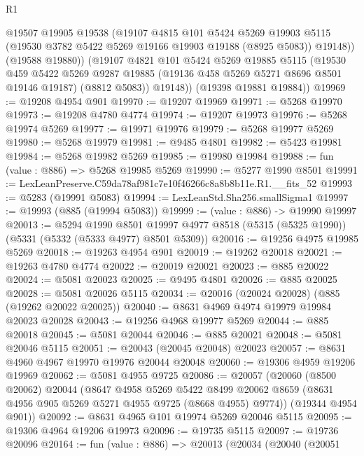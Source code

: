\begin{lexlean}{R1}
\begin{coremodule}
            @19507
            @19905
            @19538
            (@19107
              @4815
              @101
              @5424
              @5269
              @19903
              @5115
              (@19530 @3782 @5422 @5269 @19166 @19903 @19188 (@8925 @5083))
              @19148))
          (@19588 @19880))
        (@19107
          @4821
          @101
          @5424
          @5269
          @19885
          @5115
          (@19530
            @459
            @5422
            @5269
            @9287
            @19885
            (@19136 @458 @5269 @5271 @8696 @8501 @19146 @19187)
            (@8812 @5083))
          @19148))
      (@19398 @19881 @19884))
@19969 := @19208 @4954 @901
@19970 := @19207 @19969
@19971 := @5268 @19970
@19973 := @19208 @4780 @4774
@19974 := @19207 @19973
@19976 := @5268 @19974 @5269
@19977 := @19971 @19976
@19979 := @5268 @19977 @5269
@19980 := @5268 @19979
@19981 := @9485 @4801
@19982 := @5423 @19981
@19984 := @5268 @19982 @5269
@19985 := @19980 @19984
@19988 := fun (value : @886) => @5268 @19985 @5269
@19990 := @5277 @1990 @8501
@19991 := LexLeanPreserve.C59da78af981c7e10f46266c8a8b8b11e.R1.__fits_52
@19993 := @5283 (@19991 @5083)
@19994 := LexLeanStd.Sha256.smallSigma1
@19997 := @19993 (@885 (@19994 @5083))
@19999 := (value : @886) -> @19990 @19997
@20013 := @5294
    @1990
    @8501
    @19997
    @4977
    @8518
    (@5315 (@5325 @1990))
    (@5331 (@5332 (@5333 @4977) @8501 @5309))
@20016 := @19256 @4975 @19985 @5269
@20018 := @19263 @4954 @901
@20019 := @19262 @20018
@20021 := @19263 @4780 @4774
@20022 := @20019 @20021
@20023 := @885 @20022
@20024 := @5081 @20023
@20025 := @9495 @4801
@20026 := @885 @20025
@20028 := @5081 @20026 @5115
@20034 := @20016 (@20024 @20028) (@885 (@19262 @20022 @20025))
@20040 := @8631 @4969 @4974 @19979 @19984 @20023 @20028
@20043 := @19256 @4968 @19977 @5269
@20044 := @885 @20018
@20045 := @5081 @20044
@20046 := @885 @20021
@20048 := @5081 @20046 @5115
@20051 := @20043 (@20045 @20048) @20023
@20057 := @8631 @4960 @4967 @19970 @19976 @20044 @20048
@20060 := @19306 @4959 @19206 @19969
@20062 := @5081 @4955 @9725
@20086 := @20057
    (@20060
      (@8500 @20062)
      @20044
      (@8647
        @4958
        @5269
        @5422
        @8499
        @20062
        @8659
        (@8631 @4956 @905 @5269 @5271 @4955 @9725 (@8668 @4955) @9774))
      (@19344 @4954 @901))
@20092 := @8631 @4965 @101 @19974 @5269 @20046 @5115
@20095 := @19306 @4964 @19206 @19973
@20096 := @19735 @5115
@20097 := @19736 @20096
@20164 := fun (value : @886) =>
  @20013
    (@20034
      (@20040
        (@20051

\end{coremodule}
\end{lexlean}
